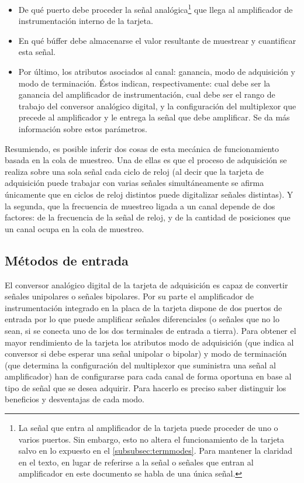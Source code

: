 \begin{itemize}
    \item De qué puerto debe proceder la señal analógica\footnote{La señal
	que entra al amplificador de la tarjeta puede proceder de uno o
	varios puertos. Sin embargo, esto no altera el funcionamiento de la
	tarjeta salvo en lo expuesto en  el \vref{subsubsec:termmodes}.
	Para mantener la claridad en el texto, en lugar de referirse a la
	señal o señales que entran al amplificador en este documento se
	habla de una única señal.} que llega al amplificador de
	instrumentación interno de la tarjeta.
    \item En qué búffer debe almacenarse el valor resultante de muestrear y
	cuantificar esta señal.
    \item Por último, los atributos asociados al canal: ganancia, modo de
	adquisición y modo de terminación. Éstos indican, respectivamente:
	cual debe ser la ganancia del amplificador de instrumentación, cual
	debe ser el rango de trabajo del conversor analógico digital, y la
	configuración del multiplexor que precede al amplificador y le
	entrega la señal que debe amplificar. Se da más información sobre
	estos parámetros.
\end{itemize}

Resumiendo, es posible inferir dos cosas de esta mecánica de funcionamiento
basada en la cola de muestreo. Una de ellas es que el proceso de
adquisición se realiza sobre una sola señal cada ciclo de reloj (al decir
que la tarjeta de adquisición puede trabajar con varias señales
simultáneamente se afirma únicamente que en ciclos de reloj distintos puede
digitalizar señales distintas). Y la segunda, que la frecuencia de muestreo
ligada a un canal depende de dos factores: de la frecuencia de la señal de
reloj, y de la cantidad de posiciones que un canal ocupa en la cola de
muestreo.


\subsection{Métodos de entrada}

El conversor analógico digital de la tarjeta de adquisición es capaz de
convertir señales unipolares o señales bipolares. Por su parte el
amplificador de instrumentación integrado en la placa de la tarjeta dispone
de dos puertos de entrada por lo que puede amplificar señales diferenciales
(o señales que no lo sean, si se conecta uno de los dos terminales de
entrada a tierra). Para obtener el mayor rendimiento de la tarjeta los
atributos modo de adquisición (que indica al conversor si debe esperar una
señal unipolar o bipolar) y modo de terminación (que determina la
configuración del multiplexor que suministra una señal al amplificador) han
de configurarse para cada canal de forma oportuna en base al tipo de señal
que se desea adquirir. Para hacerlo es preciso saber distinguir los
beneficios y desventajas de cada modo.


